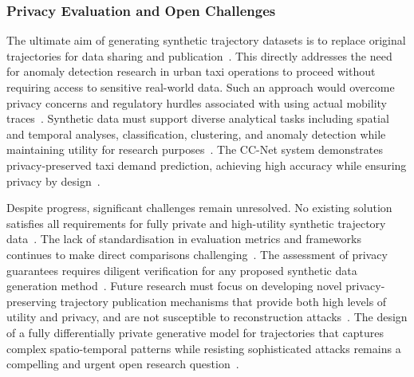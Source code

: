 \documentclass[runningheads]{llncs}
\begin{document}
\subsubsection{Privacy Evaluation and Open Challenges}

The ultimate aim of generating synthetic trajectory datasets is to replace original trajectories for data sharing and publication~\cite{buchholzSystematisationKnowledgeTrajectory2024,raoLSTMTrajGANDeepLearning2020a,liuTrajGANsUsingGenerative2018}. This directly addresses the need for anomaly detection research in urban taxi operations to proceed without requiring access to sensitive real-world data. Such an approach would overcome privacy concerns and regulatory hurdles associated with using actual mobility traces~\cite{buchholzSystematisationKnowledgeTrajectory2024,raoLSTMTrajGANDeepLearning2020a,liuTrajGANsUsingGenerative2018}. Synthetic data must support diverse analytical tasks including spatial and temporal analyses, classification, clustering, and anomaly detection while maintaining utility for research purposes~\cite{raoLSTMTrajGANDeepLearning2020a,chenDifferentiallyPrivateTrajectory2011}. The CC-Net system demonstrates privacy-preserved taxi demand prediction, achieving high accuracy while ensuring privacy by design~\cite{ozekiBalancingPrivacyUtility2023}.

Despite progress, significant challenges remain unresolved. No existing solution satisfies all requirements for fully private and high-utility synthetic trajectory data~\cite{buchholzSystematisationKnowledgeTrajectory2024}. The lack of standardisation in evaluation metrics and frameworks continues to make direct comparisons challenging~\cite{primaultLongRoadComputational2019,jinSurveyExperimentalStudy2023}. The assessment of privacy guarantees requires diligent verification for any proposed synthetic data generation method~\cite{buchholzSystematisationKnowledgeTrajectory2024}. Future research must focus on developing novel privacy-preserving trajectory publication mechanisms that provide both high levels of utility and privacy, and are not susceptible to reconstruction attacks~\cite{buchholzReconstructionAttackDifferential2022,buchholzSystematisationKnowledgeTrajectory2024,primaultLongRoadComputational2019}. The design of a fully differentially private generative model for trajectories that captures complex spatio-temporal patterns while resisting sophisticated attacks remains a compelling and urgent open research question~\cite{buchholzSystematisationKnowledgeTrajectory2024,buchholzReconstructionAttackDifferential2022}.
\end{document}
